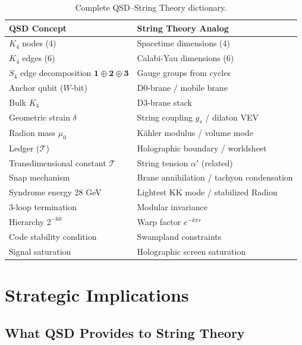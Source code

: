 \documentclass[11pt,a4paper]{article}
\theoremstyle{definition}
\newcommand{\Tc}{\mathcal{T}}
\newcommand{\dgeo}{\delta}
\newcommand{\murad}{\mu_0}
\newcommand{\gs}{g_s}
\newcommand{\ap}{\alpha'}
\begin{document}
\begin{table}[h]
\centering
\small
\begin{tabular}{ll}
\toprule
\textbf{QSD Concept} & \textbf{String Theory Analog} \\
\midrule
$K_4$ nodes (4) & Spacetime dimensions (4) \\
$K_4$ edges (6) & Calabi-Yau dimensions (6) \\
$S_4$ edge decomposition $\mathbf{1} \oplus \mathbf{2} \oplus \mathbf{3}$ & Gauge groups from cycles \\
Anchor qubit ($W$-bit) & D0-brane / mobile brane \\
Bulk $K_4$ & D3-brane stack \\
Geometric strain $\dgeo$ & String coupling $\gs$ / dilaton VEV \\
Radion mass $\murad$ & K\"ahler modulus / volume mode \\
Ledger ($\Tc$) & Holographic boundary / worldsheet \\
Transdimensional constant $\Tc$ & String tension $\ap$ (related) \\
\midrule
Snap mechanism & Brane annihilation / tachyon condensation \\
Syndrome energy 28 GeV & Lightest KK mode / stabilized Radion \\
3-loop termination & Modular invariance \\
Hierarchy $2^{-60}$ & Warp factor $e^{-k\pi r}$ \\
Code stability condition & Swampland constraints \\
Signal saturation & Holographic screen saturation \\
\bottomrule
\end{tabular}
\caption{Complete QSD--String Theory dictionary.}
\end{table}

\section{Strategic Implications}
\label{sec:strategy}

\subsection{What QSD Provides to String Theory}
\end{document}
